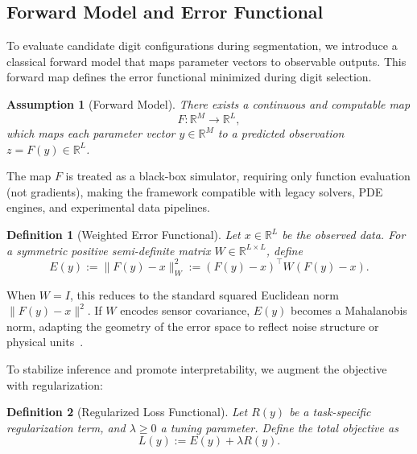\documentclass[aps,twocolumn,superscriptaddress,nofootinbib]{revtex4}
\newtheorem{definition}{Definition}
\newtheorem{assumption}{Assumption}
\begin{document}
\subsection{Forward Model and Error Functional}

To evaluate candidate digit configurations during segmentation, we introduce a classical forward model that maps parameter vectors to observable outputs. This forward map defines the error functional minimized during digit selection.

\begin{assumption}[Forward Model]
There exists a continuous and computable map
\begin{equation}
F : \mathbb{R}^M \to \mathbb{R}^L,
\end{equation}
which maps each parameter vector $y \in \mathbb{R}^M$ to a predicted observation $z = F(y) \in \mathbb{R}^L$.
\end{assumption}

\noindent The map $F$ is treated as a black-box simulator, requiring only function evaluation (not gradients), making the framework compatible with legacy solvers, PDE engines, and experimental data pipelines.

\begin{definition}[Weighted Error Functional]
Let $x \in \mathbb{R}^L$ be the observed data. For a symmetric positive semi-definite matrix $W \in \mathbb{R}^{L \times L}$, define
\begin{equation}
E(y) := \|F(y) - x\|_W^2 := (F(y) - x)^\top W (F(y) - x).
\end{equation}
\end{definition}

\noindent When $W = I$, this reduces to the standard squared Euclidean norm $\|F(y) - x\|^2$. If $W$ encodes sensor covariance, $E(y)$ becomes a Mahalanobis norm, adapting the geometry of the error space to reflect noise structure or physical units~\cite{kaipio2005inverse}.

To stabilize inference and promote interpretability, we augment the objective with regularization:

\begin{definition}[Regularized Loss Functional]
Let $R(y)$ be a task-specific regularization term, and $\lambda \geq 0$ a tuning parameter. Define the total objective as
\begin{equation}
L(y) := E(y) + \lambda R(y).
\end{equation}
\end{definition}
\end{document}
